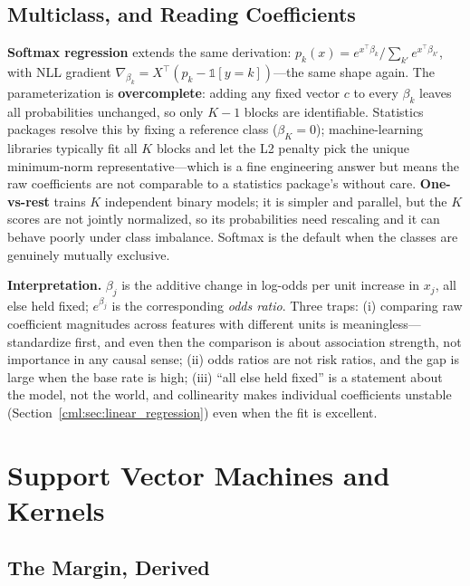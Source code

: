 \subsection{Multiclass, and Reading Coefficients}

\textbf{Softmax regression} extends the same derivation: $p_k(x) = e^{x^{\top}\beta_k}/\sum_{k'} e^{x^{\top}\beta_{k'}}$, with NLL gradient $\nabla_{\beta_k} = X^{\top}(p_k - \mathds{1}[y=k])$---the same shape again. The parameterization is \textbf{overcomplete}: adding any fixed vector $c$ to every $\beta_k$ leaves all probabilities unchanged, so only $K-1$ blocks are identifiable. Statistics packages resolve this by fixing a reference class ($\beta_K = 0$); machine-learning libraries typically fit all $K$ blocks and let the L2 penalty pick the unique minimum-norm representative---which is a fine engineering answer but means the raw coefficients are not comparable to a statistics package's without care. \textbf{One-vs-rest} trains $K$ independent binary models; it is simpler and parallel, but the $K$ scores are not jointly normalized, so its probabilities need rescaling and it can behave poorly under class imbalance. Softmax is the default when the classes are genuinely mutually exclusive.

\textbf{Interpretation.} $\beta_j$ is the additive change in log-odds per unit increase in $x_j$, all else held fixed; $e^{\beta_j}$ is the corresponding \emph{odds ratio}. Three traps: (i) comparing raw coefficient magnitudes across features with different units is meaningless---standardize first, and even then the comparison is about association strength, not importance in any causal sense; (ii) odds ratios are not risk ratios, and the gap is large when the base rate is high; (iii) ``all else held fixed'' is a statement about the model, not the world, and collinearity makes individual coefficients unstable (Section~\ref{cml:sec:linear_regression}) even when the fit is excellent.

\section{Support Vector Machines and Kernels}
\label{cml:sec:svm_kernels}

\subsection{The Margin, Derived}

